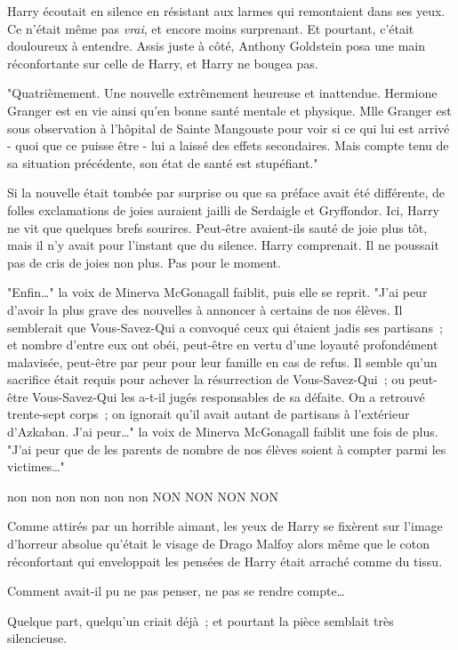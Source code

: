 Harry écoutait en silence en résistant aux larmes qui remontaient dans ses yeux. Ce n'était même pas \emph{vrai}, et encore moins surprenant. Et pourtant, c'était douloureux à entendre. Assis juste à côté, Anthony Goldstein posa une main réconfortante sur celle de Harry, et Harry ne bougea pas.

"Quatrièmement. Une nouvelle extrêmement heureuse et inattendue. Hermione Granger est en vie ainsi qu'en bonne santé mentale et physique. Mlle Granger est sous observation à l'hôpital de Sainte Mangouste pour voir si ce qui lui est arrivé - quoi que ce puisse être - lui a laissé des effets secondaires. Mais compte tenu de sa situation précédente, son état de santé est stupéfiant."

Si la nouvelle était tombée par surprise ou que sa préface avait été différente, de folles exclamations de joies auraient jailli de Serdaigle et Gryffondor. Ici, Harry ne vit que quelques brefs sourires. Peut-être avaient-ils sauté de joie plus tôt, mais il n'y avait pour l'instant que du silence. Harry comprenait. Il ne poussait pas de cris de joies non plus. Pas pour le moment.

"Enfin…" la voix de Minerva McGonagall faiblit, puis elle se reprit. "J'ai peur d'avoir la plus grave des nouvelles à annoncer à certains de nos élèves. Il semblerait que Vous-Savez-Qui a convoqué ceux qui étaient jadis ses partisans~; et nombre d'entre eux ont obéi, peut-être en vertu d'une loyauté profondément malavisée, peut-être par peur pour leur famille en cas de refus. Il semble qu'un sacrifice était requis pour achever la résurrection de Vous-Savez-Qui~; ou peut-être Vous-Savez-Qui les a-t-il jugés responsables de sa défaite. On a retrouvé trente-sept corps~; on ignorait qu'il avait autant de partisans à l'extérieur d'Azkaban. J'ai peur…" la voix de Minerva McGonagall faiblit une fois de plus. "J'ai peur que de les parents de nombre de nos élèves soient à compter parmi les victimes…"

non non non non non non NON NON NON NON

Comme attirés par un horrible aimant, les yeux de Harry se fixèrent sur l'image d'horreur absolue qu'était le visage de Drago Malfoy alors même que le coton réconfortant qui enveloppait les pensées de Harry était arraché comme du tissu.

Comment avait-il pu ne pas penser, ne pas se rendre compte…

Quelque part, quelqu'un criait déjà~; et pourtant la pièce semblait très silencieuse.

